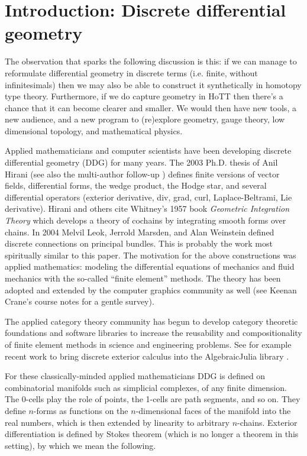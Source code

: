 \section{Introduction: Discrete differential geometry}

The observation that sparks the following discussion is this: if we can manage to reformulate differential geometry in discrete terms (i.e. finite, without infinitesimals) then we may also be able to construct it synthetically in homotopy type theory. Furthermore, if we do capture geometry in HoTT then there's a chance that it can become clearer and smaller. We would then have new tools, a new audience, and a new program to (re)explore geometry, gauge theory, low dimensional topology, and mathematical physics.

Applied mathematicians and computer scientists have been developing discrete differential geometry (DDG) for many years. The 2003 Ph.D. thesis of Anil Hirani \cite{hiranidec} (see also the multi-author follow-up \cite{desbrundec}) defines finite versions of vector fields, differential forms, the wedge product, the Hodge star, and several differential operators (exterior derivative, div, grad, curl, Laplace-Beltrami, Lie derivative). Hirani and others cite Whitney's 1957 book \emph{Geometric Integration Theory}\cite{whitney1957} which develops a theory of cochains by integrating smooth forms over chains. In 2004 Melvil Leok, Jerrold Marsden, and Alan Weinstein \cite{leok} defined discrete connections on principal bundles. This is probably the work most spiritually similar to this paper. The motivation for the above constructions was applied mathematics: modeling the differential equations of mechanics and fluid mechanics with the so-called ``finite element'' methods. The theory has been adopted and extended by the computer graphics community as well (see Keenan Crane's course notes \cite{crane_ddg} for a gentle survey).

The applied category theory community has begun to develop category theoretic foundations and software libraries to increase the reusability and compositionality of finite element methods in science and engineering problems. See for example recent work to bring discrete exterior calculus into the AlgebraicJulia library \cite{morris_decapodes} \cite{patterson_diffeq}.

For these classically-minded applied mathematicians DDG is defined on combinatorial manifolds such as simplicial complexes, of any finite dimension. The 0-cells play the role of points, the 1-cells are path segments, and so on. They define \( n \)-forms as functions on the \( n \)-dimensional faces of the manifold into the real numbers, which is then extended by linearity to arbitrary \( n \)-chains. Exterior differentiation is defined by Stokes theorem (which is no longer a theorem in this setting), by which we mean the following. 

